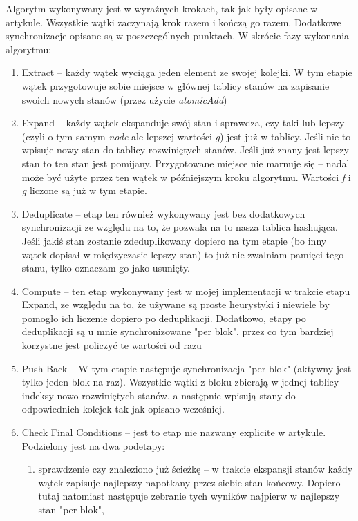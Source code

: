 \documentclass{article}
\begin{document}
Algorytm wykonywany jest w wyraźnych krokach, tak jak były opisane w artykule. Wszystkie wątki zaczynają krok razem i kończą go razem. Dodatkowe 
synchronizacje opisane są w poszczególnych punktach. W skrócie fazy wykonania algorytmu:
\begin{enumerate}
\item Extract -- każdy wątek wyciąga jeden element ze swojej kolejki. W tym etapie wątek przygotowuje sobie miejsce w głównej tablicy stanów
        na zapisanie swoich nowych stanów (przez użycie \emph{atomicAdd})
\item Expand -- każdy wątek ekspanduje swój stan i sprawdza, czy taki 
        lub lepszy (czyli o tym samym \emph{node} ale lepszej wartości \emph{g}) jest już w tablicy. 
        Jeśli nie to wpisuje nowy stan do tablicy rozwiniętych stanów. 
        Jeśli już znany jest lepszy stan to ten stan jest pomijany. Przygotowane miejsce nie marnuje się 
        -- nadal może być użyte przez ten wątek w późniejszym kroku algorytmu.
        Wartości \emph{f} i \emph{g} liczone są już w tym etapie. 
\item Deduplicate -- etap ten również wykonywany jest bez dodatkowych synchronizacji ze względu na to, że pozwala na to nasza tablica hashująca.
        Jeśli jakiś stan zostanie zdeduplikowany dopiero na tym etapie (bo inny wątek dopisał w międzyczasie lepszy stan) 
        to już nie zwalniam pamięci tego stanu, tylko oznaczam go jako usunięty.
\item Compute -- ten etap wykonywany jest w mojej implementacji w trakcie etapu Expand, 
        ze względu na to, że używane są proste heurystyki i niewiele by pomogło ich liczenie
        dopiero po deduplikacji. Dodatkowo, etapy po deduplikacji są u mnie synchronizowane "per blok", przez co tym bardziej korzystne jest policzyć
        te wartości od razu
\item Push-Back -- W tym etapie następuje synchronizacja "per blok" (aktywny jest tylko jeden blok na raz). 
        Wszystkie wątki z bloku zbierają w jednej tablicy indeksy nowo rozwiniętych stanów, a następnie wpisują
        stany do odpowiednich kolejek tak jak opisano wcześniej.
\item Check Final Conditions -- jest to etap nie nazwany explicite w artykule. Podzielony jest na dwa podetapy:
  \begin{enumerate}
    \item sprawdzenie czy znaleziono już ścieżkę -- w trakcie ekspansji stanów każdy wątek zapisuje najlepszy napotkany przez siebie stan końcowy.
           Dopiero tutaj natomiast następuje zebranie tych wyników najpierw w najlepszy stan "per blok",

\end{enumerate}
\end{enumerate}
\end{document}
